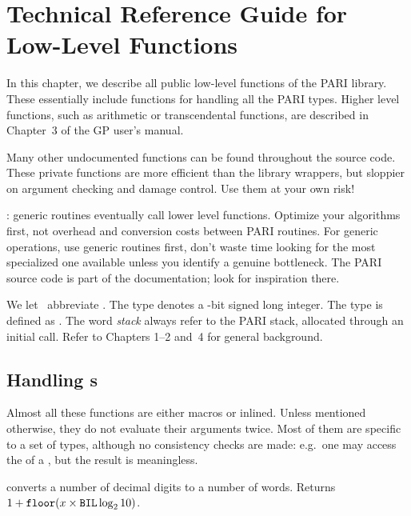 %
%
\chapter{Technical Reference Guide for Low-Level Functions}

In this chapter, we describe all public low-level functions of the
PARI library. These essentially include functions for handling all the PARI
types. Higher level functions, such as arithmetic or transcendental
functions, are described in Chapter~3 of the GP user's manual.

Many other undocumented functions can be found throughout the source code.
These private functions are more efficient than the library wrappers, but
sloppier on argument checking and damage control. Use them at your own risk!

: generic routines eventually call lower level
functions. Optimize your algorithms first, not overhead and conversion costs
between PARI routines. For generic operations, use generic routines first,
don't waste time looking for the most specialized one available unless you
identify a genuine bottleneck. The PARI source code is part of the
documentation; look for inspiration there.\smallskip

We let \B\ abbreviate . The type  denotes a
\B-bit signed long integer. The type  is defined as . The word \emph{stack} always refer to the PARI stack, allocated
through an initial  call. Refer to Chapters 1--2 and~4 for
general background. 

\section{Handling s}
\noindent Almost all these functions are either macros or inlined. Unless
mentioned otherwise, they do not evaluate their arguments twice. Most of them
are specific to a set of types, although no consistency checks are made:
e.g.~one may access the  of a , but the result is
meaningless.


 converts a number of decimal digits to a number
of words. Returns $ 1 + {\tt floor}(x \times {\tt BIL} \log_2 10)$.

